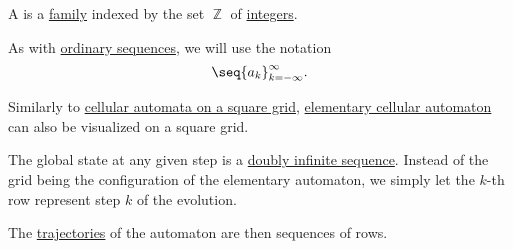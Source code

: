 \begin{definition}\label{def:doubly_infinite_sequence}
  A  is a \hyperref[def:indexed_family]{family} indexed by the set \( \BbbZ \) of \hyperref[def:integers]{integers}.

  As with \hyperref[def:sequence]{ordinary sequences}, we will use the notation
  \begin{equation*}
    \seq{ a_k }_{k=-\infty}^\infty.
  \end{equation*}
\end{definition}

\begin{remark}\label{rem:elementary_cellular_automaton_visualization}
  Similarly to \hyperref[rem:automata_on_square_grid]{cellular automata on a square grid}, \hyperref[def:elementary_cellular_automaton]{elementary cellular automaton} can also be visualized on a square grid.

  The global state at any given step is a \hyperref[def:doubly_infinite_sequence]{doubly infinite sequence}. Instead of the grid being the configuration of the elementary automaton, we simply let the \( k \)-th row represent step \( k \) of the evolution.

  The \hyperref[def:dynamical_system_trajectory]{trajectories} of the automaton are then sequences of rows.
\end{remark}

